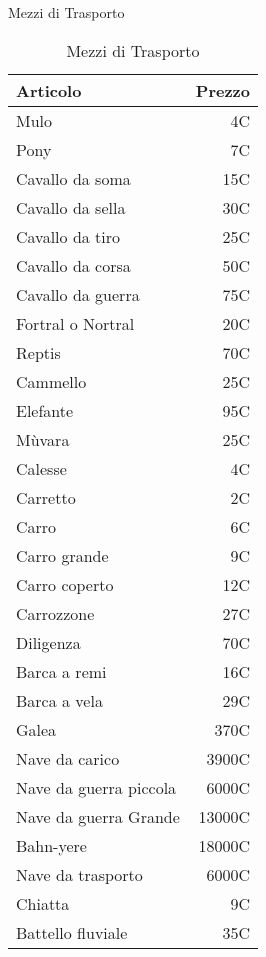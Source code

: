 \iffullversion
\begin{table}[p]
  \begin{center}
    {\Large\sc Mezzi di Trasporto}\medskip
    
    \small\begin{tabular}{|l|r|}
      \hline
      Articolo& Prezzo\\ \hline
      \hline
      Mulo&4C\\ \hline
      Pony&7C\\ \hline
      Cavallo da soma&15C\\ \hline
      Cavallo da sella&30C\\ \hline
      Cavallo da tiro&25C\\ \hline
      Cavallo da corsa&50C\\ \hline
      Cavallo da guerra&75C\\ \hline
      Fortral o Nortral&20C\\ \hline
      Reptis&70C\\ \hline
      Cammello&25C\\ \hline
      Elefante&95C\\ \hline
      M\`uvara&25C\\ \hline
      Calesse&4C\\ \hline
      Carretto&2C\\ \hline
      Carro&6C\\ \hline
      Carro grande&9C\\ \hline
      Carro coperto&12C\\ \hline
      Carrozzone&27C\\ \hline
      Diligenza&70C\\ \hline
      Barca a remi&16C\\ \hline
      Barca a vela&29C\\ \hline
      Galea&370C\\ \hline
      Nave da carico&3900C\\ \hline
      Nave da guerra piccola&6000C\\ \hline
      Nave da guerra Grande&13000C\\ \hline
      Bahn-yere&18000C\\ \hline
      Nave da trasporto&6000C\\ \hline
      Chiatta&9C\\ \hline
      Battello fluviale&35C\\ \hline
     \end{tabular}
    \caption{Mezzi di Trasporto}
  \end{center}         
\end{table}    
\fi

